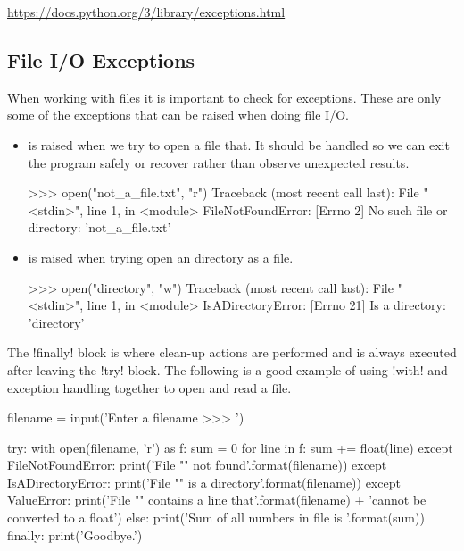 \documentclass[11pt]{cselabheader}
\begin{document}
\begin{center}
\url{https://docs.python.org/3/library/exceptions.html}
\end{center}

\subsection{File I/O Exceptions}
When working with files it is important to check for exceptions.
These are only some of the exceptions that can be raised when doing file I/O.

\begin{itemize}
  \item {} is raised when we try to open a file
  that. It should be handled so we can exit the program safely or recover
  rather than observe unexpected results.
  \begin{pyconcode}
>>> open("not_a_file.txt", "r")
Traceback (most recent call last):
  File "<stdin>", line 1, in <module>
FileNotFoundError: [Errno 2] No such file or directory: 'not_a_file.txt'
  \end{pyconcode}

  \item {} is raised when trying open an
  directory as a file.
  \begin{pyconcode}
>>> open("directory", "w")
Traceback (most recent call last):
  File "<stdin>", line 1, in <module>
IsADirectoryError: [Errno 21] Is a directory: 'directory'
  \end{pyconcode}
\end{itemize}

The \pythoninline!finally! block is where clean-up actions are performed and is
always executed after leaving the \pythoninline!try! block.
The following is a good example of using \pythoninline!with! and exception
handling together to open and read a file.

\begin{python3code}
filename = input('Enter a filename >>> ')

try:
    with open(filename, 'r') as f:
        sum = 0
        for line in f:
            sum += float(line)
except FileNotFoundError:
    print('File "{}" not found'.format(filename))
except IsADirectoryError:
    print('File "{}" is a directory'.format(filename))
except ValueError:
    print('File "{}" contains a line that'.format(filename)
        + 'cannot be converted to a float')
else:
    print('Sum of all numbers in file is {}'.format(sum))
finally:
    print('Goodbye.')
\end{python3code}
\end{document}
